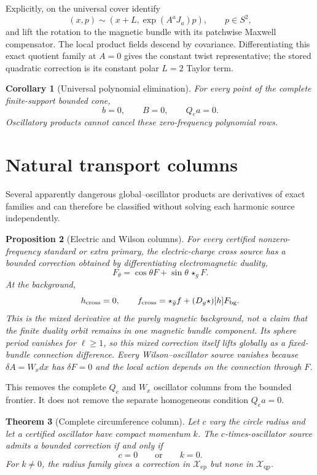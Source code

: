\documentclass[11pt]{article}
\newtheorem{theorem}{Theorem}[section]
\newtheorem{proposition}[theorem]{Proposition}
\newtheorem{corollary}[theorem]{Corollary}
\theoremstyle{definition}
\theoremstyle{remark}
\newcommand{\Xep}{\mathscr X_{\mathrm{ep}}}
\newcommand{\Xqp}{\mathscr X_{\mathrm{qp}}}
\begin{document}
Explicitly, on the universal cover identify
\begin{equation}
 (x,p)\sim(x+L,\exp(A^aJ_a)p),
 \qquad p\in S^2,
\end{equation}
and lift the rotation to the magnetic bundle with its patchwise Maxwell
compensator.  The local product fields descend by covariance.  Differentiating
this exact quotient family at \(A=0\) gives the constant twist representative;
the stored quadratic correction is its constant polar \(L=2\) Taylor term.

\begin{corollary}[Universal polynomial elimination]
For every point of the complete finite-support bounded cone,
\[
 b=0,\qquad B=0,\qquad Q_ea=0.
\]
Oscillatory products cannot cancel these zero-frequency polynomial rows.
\end{corollary}

\section{Natural transport columns}

Several apparently dangerous global--oscillator products are derivatives of
exact families and can therefore be classified without solving each harmonic
source independently.

\begin{proposition}[Electric and Wilson columns]
For every certified nonzero-frequency standard or extra primary, the
electric-charge cross source has a bounded correction obtained by
differentiating electromagnetic duality,
\[
 F_\theta=\cos\theta F+\sin\theta\,{\star_g F}.
\]
At the background,
\[
 h_{\rm cross}=0,\qquad
 f_{\rm cross}=\star_{\bar g}f+(D_g\star)[h]F_{\rm bg}.
\]
This is the mixed derivative at the purely magnetic background, not a claim
that the finite duality orbit remains in one magnetic bundle component.  Its
sphere period vanishes for \(\ell\ge1\), so this mixed correction itself
lifts globally as a fixed-bundle connection difference.  Every
Wilson--oscillator source vanishes because
\(\delta A=W_xdx\) has \(\delta F=0\) and the local action depends on the
connection through \(F\).
\end{proposition}

This removes the complete \(Q_e\) and \(W_x\) oscillator columns from the
bounded frontier.  It does not remove the separate homogeneous condition
\(Q_ea=0\).

\begin{theorem}[Complete circumference column]
Let \(c\) vary the circle radius and let a certified oscillator have compact
momentum \(k\).  The \(c\)-times-oscillator source admits a bounded correction
if and only if
\[
 c=0\qquad\text{or}\qquad k=0.
\]
For \(k\ne0\), the radius family gives a correction in \(\Xep\) but none in
\(\Xqp\).
\end{theorem}
\end{document}
